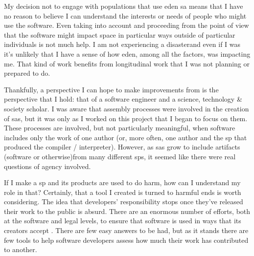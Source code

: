 \documentclass[a4paper,man,natbib,floatsintext]{apa6}
\begin{document}
  My decision not to engage with populations that use \acrshort{eden} \gls{sa} means that I have no reason to believe I can understand the interests or needs of people who might use the software. Even taking \citet{Kitchin2011-af} into account and proceeding from the point of view that the software might impact space in particular ways outside of particular individuals is not much help. I am not experiencing a disaster\footnotemark and even if I was it's unlikely that I have a sense of how \acrshort{eden}, among all the factors, was impacting me. That kind of work benefits from longitudinal work that I was not planning or prepared to do.


  Thankfully, a perspective I can hope to make improvements from is the perspective that I hold: that of a software engineer and a science, technology \& society scholar. I was aware that assembly processes were involved in the creation of \glspl{sa}, but it was only as I worked on this project that I began to focus on them. These processes are involved, but not particularly meaningful, when software includes only the work of one author (or, more often, one author and the \gls{sp} that produced the compiler / interpreter). However, as \glspl{sa} grow to include artifacts (software or otherwise)from many different \glspl{sp}, it seemed like there were real questions of agency involved. 

  If I make a \gls{sp} and its products are used to do harm, how can I understand my role in that? Certainly, that a tool I created is turned to harmful ends is worth considering. The idea that developers' responsibility stops once they've released their work to the public is absurd. There are an enormous number of efforts, both at the software and legal levels, to ensure that software is used in ways that its creators accept \citep{Gabriella_Coleman2012-lq,Kelty2008-jm}. There are few easy answers to be had, but as it stands there are few tools to help software developers assess how much their work has contributed to another. 
\end{document}
